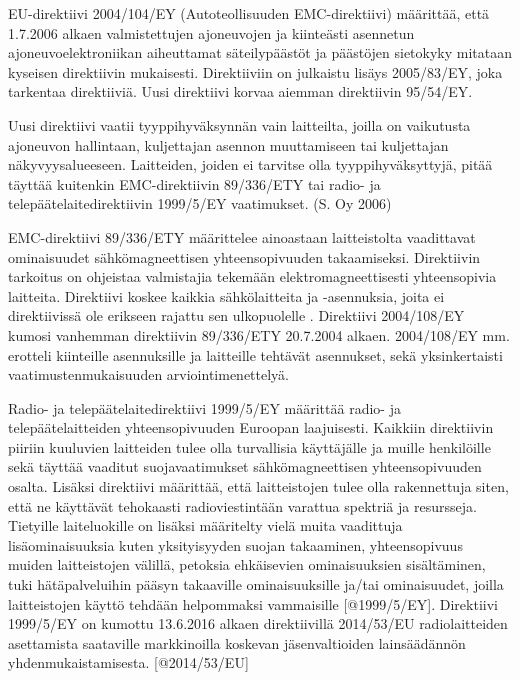 \documentclass[11pt,a4paper,oneside,article]{memoir}
\begin{document}
EU-direktiivi 2004/104/EY (Autoteollisuuden EMC-direktiivi) määrittää, että
1.7.2006 alkaen valmistettujen ajoneuvojen ja kiinteästi asennetun
ajoneuvoelektroniikan aiheuttamat säteilypäästöt ja päästöjen sietokyky
mitataan kyseisen direktiivin mukaisesti. Direktiiviin on julkaistu
lisäys 2005/83/EY, joka tarkentaa direktiiviä. Uusi direktiivi korvaa
aiemman direktiivin 95/54/EY.

Uusi direktiivi vaatii tyyppihyväksynnän vain laitteilta, joilla on
vaikutusta ajoneuvon hallintaan, kuljettajan asennon muuttamiseen tai
kuljettajan näkyvyysalueeseen. Laitteiden, joiden ei tarvitse olla
tyyppihyväksyttyjä, pitää täyttää kuitenkin EMC-direktiivin 89/336/ETY
tai radio- ja telepäätelaitedirektiivin 1999/5/EY vaatimukset. (S. Oy
2006) \cite{1999/5/EY} \cite{89/336/ETY}

EMC-direktiivi 89/336/ETY määrittelee ainoastaan laitteistolta
vaadittavat ominaisuudet sähkömagneettisen yhteensopivuuden
takaamiseksi. Direktiivin tarkoitus on ohjeistaa valmistajia tekemään
elektromagneettisesti yhteensopivia laitteita. Direktiivi koskee kaikkia
sähkölaitteita ja -asennuksia, joita ei direktiivissä ole erikseen
rajattu sen ulkopuolelle \cite{89/336/ETY}. Direktiivi 2004/108/EY
kumosi vanhemman direktiivin 89/336/ETY 20.7.2004 alkaen. 2004/108/EY
mm. erotteli kiinteille asennuksille ja laitteille tehtävät asennukset,
sekä yksinkertaisti vaatimustenmukaisuuden arviointimenettelyä.
\cite{2004/108/EY}

Radio- ja telepäätelaitedirektiivi 1999/5/EY määrittää radio- ja
telepäätelaitteiden yhteensopivuuden Euroopan laajuisesti. Kaikkiin
direktiivin piiriin kuuluvien laitteiden tulee olla turvallisia
käyttäjälle ja muille henkilöille sekä täyttää vaaditut
suojavaatimukset sähkömagneettisen yhteensopivuuden osalta. Lisäksi
direktiivi määrittää, että laitteistojen tulee olla rakennettuja siten,
että ne käyttävät tehokaasti radioviestintään varattua spektriä ja
resursseja. Tietyille laiteluokille on lisäksi määritelty vielä muita
vaadittuja lisäominaisuuksia kuten yksityisyyden suojan takaaminen,
yhteensopivuus muiden laitteistojen välillä, petoksia
ehkäisevien ominaisuuksien sisältäminen, tuki hätäpalveluihin pääsyn takaaville
ominaisuuksille ja/tai ominaisuudet, joilla laitteistojen
käyttö tehdään helpommaksi vammaisille {[}@1999/5/EY{]}. Direktiivi
1999/5/EY on kumottu 13.6.2016 alkaen direktiivillä 2014/53/EU
radiolaitteiden asettamista saataville markkinoilla koskevan
jäsenvaltioiden lainsäädännön yhdenmukaistamisesta. {[}@2014/53/EU{]}
\end{document}
